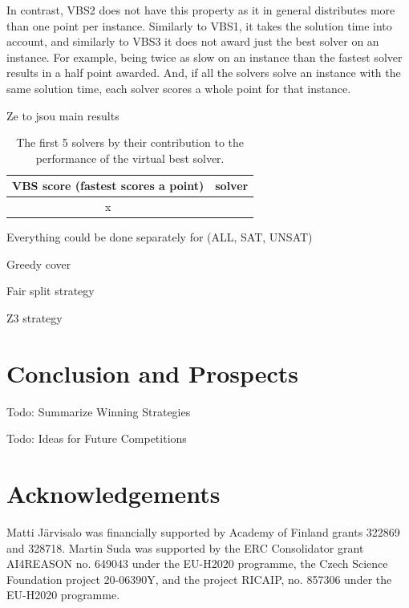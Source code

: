 \documentclass{elsarticle}
\newcommand{\todo}[1]{{\color{purple}Todo: #1}}
\begin{document}
In contrast, VBS2 does not have this property as it in general distributes more than one point per instance.
Similarly to VBS1, it takes the solution time into account,
and similarly to VBS3 it does not award just the best solver on an instance.
For example, being twice as slow on an instance than the fastest solver results in a half point awarded.
And, if all the solvers solve an instance with the same solution time,
each solver scores a whole point for that instance. 


\newpage



Ze to jsou main results



\begin{table}
\caption{The first 5 solvers by their contribution to the performance of the virtual best solver.}
\label{tab:parallelUNS}
\centering
\begin{tabular}{cl}
VBS score (fastest scores a point) & solver \\
\hline
x
\end{tabular}
\end{table}


\newpage

Everything could be done separately for (ALL, SAT, UNSAT)





Greedy cover


Fair split strategy


Z3 strategy




\section{Conclusion and Prospects}
\label{sec:conclusion}

\todo{Summarize Winning Strategies}

\todo{Ideas for Future Competitions}

\section*{Acknowledgements}
Matti J\"arvisalo was financially supported by Academy of Finland grants 322869 and 328718.
Martin Suda was supported by the ERC Consolidator grant AI4REASON no. 649043 under the EU-H2020 programme,
the Czech Science Foundation project 20-06390Y, and the project RICAIP, no. 857306 under the EU-H2020 programme.



\end{document}
